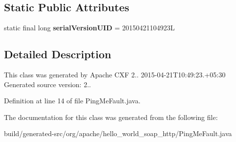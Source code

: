 \subsection*{Static Public Attributes}
\begin{DoxyCompactItemize}
\item 
\hypertarget{classorg_1_1apache_1_1hello__world__soap__http_1_1_ping_me_fault_a7051b65b642e18b64eef950e0eff629c}{}static final long {\bfseries serial\+Version\+U\+I\+D} = 20150421104923\+L\label{classorg_1_1apache_1_1hello__world__soap__http_1_1_ping_me_fault_a7051b65b642e18b64eef950e0eff629c}

\end{DoxyCompactItemize}


\subsection{Detailed Description}
This class was generated by Apache C\+X\+F 2.. 2015-\/04-\/21\+T10\+:49\+:23.+05\+:30 Generated source version\+: 2.. 

Definition at line 14 of file Ping\+Me\+Fault.\+java.



The documentation for this class was generated from the following file\+:\begin{DoxyCompactItemize}
\item 
build/generated-\/src/org/apache/hello\+\_\+world\+\_\+soap\+\_\+http/Ping\+Me\+Fault.\+java\end{DoxyCompactItemize}
